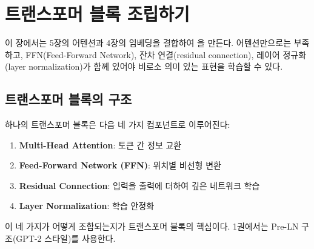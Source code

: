 \chapter{트랜스포머 블록 조립하기}
\label{ch:transformer_block}

이 장에서는 5장의 어텐션과 4장의 임베딩을 결합하여 을 만든다. 어텐션만으로는 부족하고, FFN(Feed-Forward Network), 잔차 연결(residual connection), 레이어 정규화(layer normalization)가 함께 있어야 비로소 의미 있는 표현을 학습할 수 있다.

\section{트랜스포머 블록의 구조}

하나의 트랜스포머 블록은 다음 네 가지 컴포넌트로 이루어진다:

\begin{enumerate}
  \item \textbf{Multi-Head Attention}: 토큰 간 정보 교환
  \item \textbf{Feed-Forward Network (FFN)}: 위치별 비선형 변환
  \item \textbf{Residual Connection}: 입력을 출력에 더하여 깊은 네트워크 학습
  \item \textbf{Layer Normalization}: 학습 안정화
\end{enumerate}

이 네 가지가 어떻게 조합되는지가 트랜스포머 블록의 핵심이다. 1권에서는 Pre-LN 구조(GPT-2 스타일)를 사용한다.

